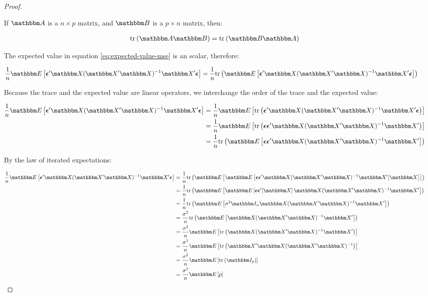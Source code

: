 \begin{proof}
\begin{lemma*}
    If $\Mat{A}$ is a $n \times p$ matrix, and $\Mat{B}$  is a $p \times n$ matrix, then:

    \begin{align*}
        \tr{\Mat{A}\Mat{B}} = \tr{\Mat{B}\Mat{A}}
    \end{align*}
\end{lemma*}

The expected value in equation \ref{eq:expected-value-mse} is an scalar, therefore:

\begin{align*}
\frac{1}{n} \E{
    \Vec{\epsilon}'\Mat{X}(\Mat{X}'\Mat{X})^{-1}\Mat{X}'\Vec{\epsilon}
}
&= \frac{1}{n} \tr{\E{
    \Vec{\epsilon}'\Mat{X}(\Mat{X}'\Mat{X})^{-1}\Mat{X}'\Vec{\epsilon}
}}
\end{align*}

Because the trace and the expected value are linear operators, we interchange the order of the trace and the expected value:

\begin{align*}
\frac{1}{n} \E{
    \Vec{\epsilon}'\Mat{X}(\Mat{X}'\Mat{X})^{-1}\Mat{X}'\Vec{\epsilon}
}
&= \frac{1}{n} \E{\tr{
    \Vec{\epsilon}'\Mat{X}(\Mat{X}'\Mat{X})^{-1}\Mat{X}'\Vec{\epsilon}
}} \\
&= \frac{1}{n} \E{\tr{
    \Vec{\epsilon}\Vec{\epsilon}'\Mat{X}(\Mat{X}'\Mat{X})^{-1}\Mat{X}'
}}\\
&= \frac{1}{n} \tr{\E{
    \Vec{\epsilon}\Vec{\epsilon}'\Mat{X}(\Mat{X}'\Mat{X})^{-1}\Mat{X}'
}}
\end{align*}

By the law of iterated expectations:

\begin{align*}
\frac{1}{n} \E{
    \Vec{\epsilon}'\Mat{X}(\Mat{X}'\Mat{X})^{-1}\Mat{X}'\Vec{\epsilon}
}
&= \frac{1}{n} \tr{\E{\E{
    \Vec{\epsilon}\Vec{\epsilon}'\Mat{X}(\Mat{X}'\Mat{X})^{-1}\Mat{X}'
 | \Mat{X}} }}\\
&= \frac{1}{n} \tr{\E{\E{
    \Vec{\epsilon}\Vec{\epsilon}'| \Mat{X}} \Mat{X}(\Mat{X}'\Mat{X})^{-1}\Mat{X}'}}\\
&= \frac{1}{n} \tr{
        \E{
            \sigma^2 \Mat{I}_n
            \Mat{X}(\Mat{X}'\Mat{X})^{-1}\Mat{X}'
        }
    }\\
&= \frac{\sigma^2}{n} \tr{
        \E{
            \Mat{X}(\Mat{X}'\Mat{X})^{-1}\Mat{X}'
        }
    }\\
&= \frac{\sigma^2}{n} \E{
        \tr{
            \Mat{X}(\Mat{X}'\Mat{X})^{-1}\Mat{X}'
        }
    }\\
&= \frac{\sigma^2}{n} \E{
        \tr{
            \Mat{X}'\Mat{X}(\Mat{X}'\Mat{X})^{-1}
        }
    }\\
&= \frac{\sigma^2}{n} \E{
        \tr{
           \Mat{I}_p 
        }
    }\\
&= \frac{\sigma^2}{n} \E{p}\\
\end{align*}


\end{proof}
